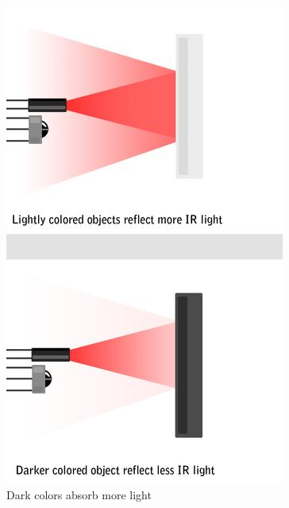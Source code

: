 \begin{enumerate}[topsep=-2pt, itemsep=2pt]
			\begin{figure}
				\centering
				\includegraphics[width=0.4\linewidth]{IR_transmitter_reciever2}
				\caption{Dark colors absorb more light}
				\label{fig:IR_transmitter_reciever2}
			\end{figure}



	\end{enumerate}
	
	